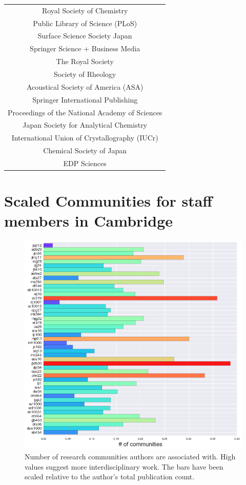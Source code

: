 \begin{table}
\begin{tabular}{||c||}
Royal Society of Chemistry                        \\
Public Library of Science (PLoS)                  \\
Surface Science Society Japan                     \\
Springer Science + Business Media                 \\
The Royal Society                                 \\
Society of Rheology                               \\
Acoustical Society of America (ASA)               \\
Springer International Publishing                 \\
Proceedings of the National Academy of Sciences   \\
Japan Society for Analytical Chemistry            \\
International Union of Crystallography (IUCr)     \\
Chemical Society of Japan                         \\
EDP Sciences                                      \\
\hline
\end{tabular}
\end{table}
\section{Scaled Communities for staff members in Cambridge}
\begin{center}
\begin{figure}[H]
\label{fig:LABELLEDDENDRO}
  \centering
    \includegraphics[scale=0.8]{Analysis/community_detection2.png}
    \caption{Number of research communities authors are associated with. High values suggest more interdisciplinary work. The bars have been scaled relative to the author's total publication count. }
\end{figure} 
\end{center}